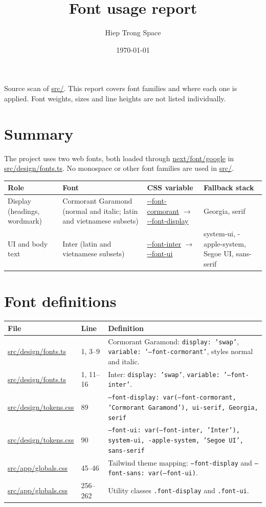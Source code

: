 \documentclass[11pt,a4paper]{article}
\title{Font usage report}
\author{Hiep Trong Space}
\date{\today}
\DeclareRobustCommand{\file}[1]{{\ttfamily\small\url{#1}}}
\begin{document}
\maketitle

Source scan of \file{src/}. This report covers font families and where each one is applied.
Font weights, sizes and line heights are not listed individually.

\section{Summary}

The project uses two web fonts, both loaded through \file{next/font/google} in \file{src/design/fonts.ts}.
No monospace or other font families are used in \file{src/}.

\begin{table}[h]
\centering
\small
\begin{tabular}{@{}p{2.8cm}p{3.6cm}p{3.2cm}p{4.4cm}@{}}
\toprule
Role & Font & CSS variable & Fallback stack \\
\midrule
Display (headings, wordmark) & Cormorant Garamond (normal and italic; latin and vietnamese subsets) & \file{--font-cormorant} $\rightarrow$ \file{--font-display} & Georgia, serif \\
UI and body text & Inter (latin and vietnamese subsets) & \file{--font-inter} $\rightarrow$ \file{--font-ui} & system-ui, -apple-system, Segoe UI, sans-serif \\
\bottomrule
\end{tabular}
\end{table}

\section{Font definitions}

\begin{longtable}{@{}p{5.2cm}p{1.6cm}p{8.6cm}@{}}
\toprule
File & Line & Definition \\
\midrule
\endhead
\file{src/design/fonts.ts} & 1, 3--9 & Cormorant Garamond: \texttt{display: 'swap'}, \texttt{variable: '--font-cormorant'}, styles normal and italic. \\
\file{src/design/fonts.ts} & 1, 11--16 & Inter: \texttt{display: 'swap'}, \texttt{variable: '--font-inter'}. \\
\file{src/design/tokens.css} & 89 & \texttt{--font-display: var(--font-cormorant, 'Cormorant Garamond'), ui-serif, Georgia, serif} \\
\file{src/design/tokens.css} & 90 & \texttt{--font-ui: var(--font-inter, 'Inter'), system-ui, -apple-system, 'Segoe UI', sans-serif} \\
\file{src/app/globals.css} & 45--46 & Tailwind theme mapping: \texttt{--font-display} and \texttt{--font-sans: var(--font-ui)}. \\
\file{src/app/globals.css} & 256--262 & Utility classes \texttt{.font-display} and \texttt{.font-ui}. \\
\bottomrule
\end{longtable}
\end{document}
